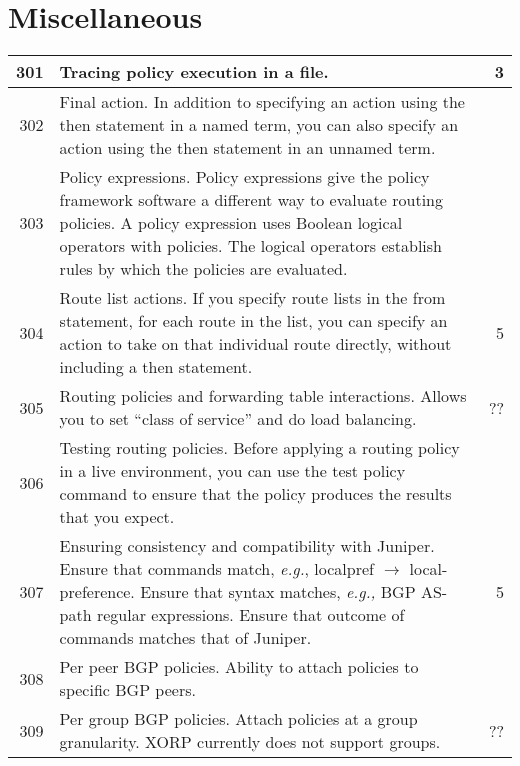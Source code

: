 \documentclass[letterpaper]{article}
\begin{document}
\section{Miscellaneous}
\begin{center}
\tabletail{
\hline
}
\begin{supertabular}{|r |p{12cm} |r|}
\hline

301 &
Tracing policy execution in a file.
& 3 \\
\hline

302 &
Final action.  In addition to specifying an action using the then statement in a
named term, you can also specify an action using the then statement in an
unnamed term.
&   \\
\hline

303 &
Policy expressions.  Policy expressions give the policy framework software a
different way to evaluate routing policies. A policy expression uses Boolean
logical operators with policies. The logical operators establish rules by which
the policies are evaluated.
&   \\
\hline

304 &
Route list actions.  If you specify route lists in the from statement, for each
route in the list, you can specify an action to take on that individual route
directly, without including a then statement.
& 5 \\
\hline

305 &
Routing policies and forwarding table interactions.  Allows you to set ``class
of service'' and do load balancing.
& ?? \\
\hline

306 &
Testing routing policies.  Before applying a routing policy in a live
environment, you can use the test policy command to ensure that the policy
produces the results that you expect. 
&   \\
\hline

307 &
Ensuring consistency and compatibility with Juniper.  Ensure that commands
match, {\em e.g.}, localpref $\to$ local-preference.  Ensure that syntax
matches, {\em e.g.,} BGP AS-path regular expressions.  Ensure that outcome of
commands matches that of Juniper.
& 5 \\
\hline

308 &
Per peer BGP policies.  Ability to attach policies to specific BGP peers.
&
  \\
\hline

309 &
Per group BGP policies.  Attach policies at a group granularity.  XORP currently
does not support groups.
&
?? \\
\hline


\end{supertabular}
\end{center}
\end{document}
